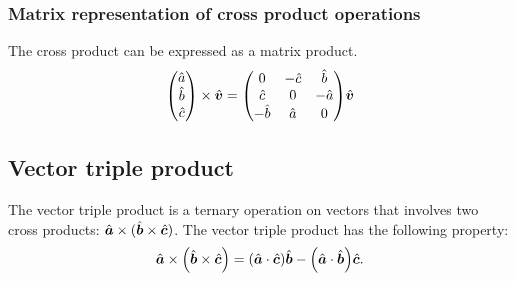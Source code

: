 \subsubsection{Matrix representation of cross product operations}
The cross product can be expressed as a matrix product.
\begin{equation}
    \begin{pmatrix}
        \cp{a} \\ \cp{b} \\ \cp{c}
    \end{pmatrix}
    \times
    \vectcp{v}
    =
    \begin{pmatrix}
        0 & -\cp{c} & \cp{b} \\
        \cp{c} & 0 & -\cp{a} \\
        -\cp{b} & \cp{a} & 0
    \end{pmatrix}
    \vectcp{v}
    \label{eq:cross_product_matrix}
\end{equation}





\subsection{Vector triple product}

The vector triple product is a ternary operation on vectors that involves two cross products: $\hat{\bm{a}} \times (\hat{\bm{b}} \times \hat{\bm{c}})$.
The vector triple product has the following property:
\begin{equation}
    \vectcp{a} \times \left(\vectcp{b} \times \vectcp{c}\right)
    =
    \left(\vectcp{a} \cdot \vectcp{c}\right) \vectcp{b}
    -
    \left(\vectcp{a} \cdot \vectcp{b}\right) \vectcp{c}
    \text{.}
    \label{eq:vector_triple_product}
\end{equation}

